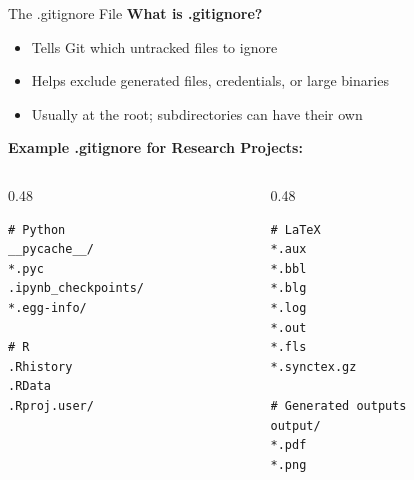 \documentclass[11pt,aspectratio=169]{beamer}
\begin{document}
\begin{frame}[fragile]{The .gitignore File}
\textbf{What is .gitignore?}
\begin{itemize}
    \item Tells Git which untracked files to ignore
    \item Helps exclude generated files, credentials, or large binaries
    \item Usually at the root; subdirectories can have their own
\end{itemize}

\vspace{0.2cm}

\textbf{Example .gitignore for Research Projects:}
\begin{columns}
\begin{column}{0.48\textwidth}
\scriptsize
\begin{verbatim}
# Python
__pycache__/
*.pyc
.ipynb_checkpoints/
*.egg-info/

# R
.Rhistory
.RData
.Rproj.user/

\end{verbatim}
\end{column}

\begin{column}{0.48\textwidth}
\scriptsize
\begin{verbatim}
# LaTeX
*.aux
*.bbl
*.blg
*.log
*.out
*.fls
*.synctex.gz

# Generated outputs
output/
*.pdf
*.png
\end{verbatim}
\end{column}
\end{columns}

\end{frame}
\end{document}
